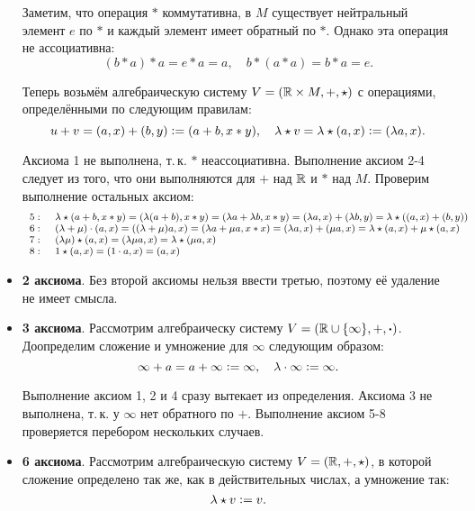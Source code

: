 \begin{orangebox}
\begin{itemize}
            Заметим, что операция $\ast$ коммутативна, в $M$ существует нейтральный элемент $e$ по $\ast$ и каждый элемент имеет обратный по $\ast$. Однако эта операция не ассоциативна:
            $$
            (b \ast a) \ast a = e \ast a = a,\quad b \ast (a \ast a) = b \ast a = e.
            $$

            Теперь возьмём алгебраическую систему $V = (\mathbb{R} \times M, +, \star)$ с операциями, определёнными по следующим правилам:
            $$
            u + v = (a, x) + (b, y) \vcentcolon = (a + b, x \ast y),\quad \lambda \star v = \lambda \star (a, x) \vcentcolon = (\lambda a, x).
            $$

            Аксиома 1 не выполнена, т.\,к. $\ast$ неассоциативна. Выполнение аксиом 2-4 следует из того, что они выполняются для $+$ над $\mathbb{R}$ и $\ast$ над $M$. Проверим выполнение остальных аксиом:
            $$\footnotesize
            \begin{array}{rl}
                5:\; & \lambda \star (a + b, x \ast y) = (\lambda(a + b), x \ast y) = (\lambda a + \lambda b, x \ast y) = (\lambda a, x) + (\lambda b, y) = \lambda\star((a, x) + (b, y))\\
                6:\; & (\lambda + \mu) \cdot (a, x) = ((\lambda + \mu)a, x) = (\lambda a + \mu a, x \ast x) = (\lambda a, x) + (\mu a, x) = \lambda \star (a, x) + \mu \star (a, x)\\
                7:\; & (\lambda\mu) \star (a, x) = (\lambda\mu a, x) = \lambda \star (\mu a, x)\\
                8:\; & 1 \star (a, x) = (1 \cdot a, x) = (a, x)
            \end{array}
            $$
        \item \textbf{2 аксиома}. Без второй аксиомы нельзя ввести третью, поэтому её удаление не имеет смысла.
        \item \textbf{3 аксиома}. Рассмотрим алгебраическу систему $V = (\mathbb{R} \cup \{\infty\}, +, \boldsymbol{\cdot})$. Доопределим сложение и умножение для $\infty$ следующим образом:
            $$
            \infty + a = a + \infty \vcentcolon = \infty,\quad \lambda \cdot \infty \vcentcolon = \infty.
            $$

            Выполнение аксиом 1, 2 и 4 сразу вытекает из определения. Аксиома 3 не выполнена, т.\,к. у $\infty$ нет обратного по $+$. Выполнение аксиом 5-8 проверяется перебором нескольких случаев.
        \item \textbf{6 аксиома}. Рассмотрим алгебраическую систему $V = (\mathbb{R}, +, \star)$, в которой сложение определено так же, как в действительных числах, а умножение так:
            $$
            \lambda \star v \vcentcolon = v.
            $$


\end{itemize}
\end{orangebox}
